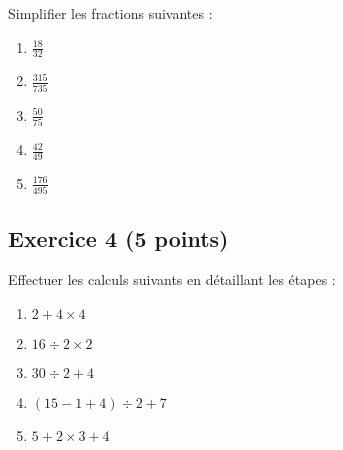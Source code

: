 \documentclass[14 pt]{extarticle}
\theoremstyle{plain}
\begin{document}
 Simplifier les fractions suivantes : 
 \begin{enumerate}
 \item $\frac{18}{32}$
 \item $\frac{315}{735}$
 \item $\frac{50}{75}$
 \item $\frac{42}{49}$
 \item $\frac{176}{495}$
 \end{enumerate}
 
 
 \subsection*{Exercice 4 (5 points)}
 
 Effectuer les calculs suivants en détaillant les étapes : 
 \begin{enumerate}
 \item $2 + 4 \times 4$
 \item $ 16 \div 2 \times 2$
 \item $ 30 \div 2 + 4$
 \item $ (15 - 1 + 4) \div 2 + 7$
 \item $ 5 + 2 \times 3 + 4$
 \end{enumerate} 
 
 	
\end{document}
